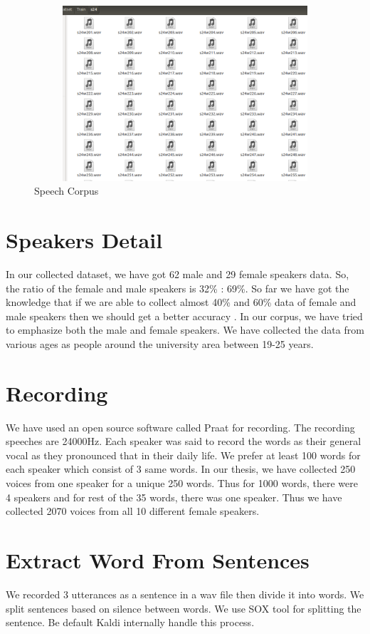 \documentclass{standalone}
\begin{document}
\begin{figure}[h]
 \centering
 \centerline{\includegraphics[width=13cm, height=6.5cm]{img/WavFile.pdf}}
 \caption{Speech Corpus}
\label{fig:speech-corpus}
\end{figure}


\section{Speakers Detail}
  In our collected dataset, we have got 62 male and 29 female speakers data. So, the ratio of the female and male speakers is 32\% : 69\%. So far we have got the knowledge that if we are able to collect almost 40\% and 60\% data of female and male speakers then we should get a better accuracy \cite{hinton2012deep}.
  In our corpus, we have tried to emphasize both the male and female speakers. We have collected the data from various ages as people around the university area between 19-25 years.

\section{Recording}
 We have used an open source software called Praat for recording. 
The recording speeches are 24000Hz. Each speaker was said to record the words as their general vocal as they pronounced that in their daily life. We prefer at least 100 words for each speaker which consist of 3 same words. In our thesis, we have collected 250 voices from one speaker for a unique 250 words. Thus for 1000 words, there were 4 speakers and for rest of the 35 words, there was one speaker. Thus we have collected 2070 voices from all 10 different female speakers.

\section{Extract Word From Sentences}
We recorded 3 utterances as a sentence in a wav file then divide it into words. We split sentences based
on silence between words. We use SOX tool for splitting the sentence. Be default Kaldi internally handle this process.
\end{document}
